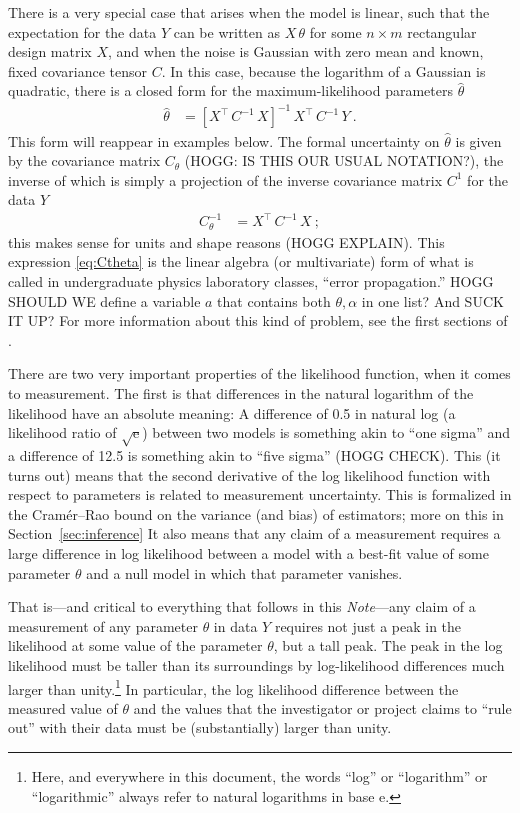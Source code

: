 \documentclass{article}
\newcommand{\documentname}{\textsl{Note}}
\newcommand{\sectionname}{Section}
\newcommand{\secref}[1]{\sectionname~\ref{#1}}
\newcommand{\e}{\mathrm{e}} %
\begin{document}
There is a very special case that arises when the model is linear,
such that the expectation for the data $Y$ can be written as $X\,\theta$ for some $n\times m$ rectangular design matrix $X$,
and when the noise is Gaussian with zero mean and known, fixed covariance tensor $C$.
In this case, because the logarithm of a Gaussian is quadratic, there is a closed form for the maximum-likelihood parameters $\hat\theta$
\begin{align}
    \hat\theta &= [X^\top\,C^{-1}\,X]^{-1}\,X^\top\,C^{-1}\,Y ~.\label{eq:wls}
\end{align}
This form will reappear in examples below.
The formal uncertainty on $\hat\theta$ is given by the covariance matrix $C_\theta$ (HOGG: IS THIS OUR USUAL NOTATION?), the inverse of which is simply a projection of the inverse covariance matrix $C^{1}$ for the data $Y$
\begin{align}
    C_\theta^{-1} &= X^\top\,C^{-1}\,X ~; \label{eq:Ctheta}
\end{align}
this makes sense for units and shape reasons (HOGG EXPLAIN).
This expression \eqref{eq:Ctheta} is the linear algebra (or multivariate) form of what is called in undergraduate physics laboratory classes, ``error propagation.''
HOGG SHOULD WE define a variable $a$ that contains both $\theta,\alpha$ in one list? And SUCK IT UP?
For more information about this kind of problem, see the first sections of \cite{fittingaline}.

There are two very important properties of the likelihood function, when it comes to measurement.
The first is that differences in the natural logarithm of the likelihood have an absolute meaning:
A difference of 0.5 in natural log (a likelihood ratio of $\sqrt{\e}$) between two models is something akin to ``one sigma'' and a difference of 12.5 is something akin to ``five sigma'' (HOGG CHECK).
This (it turns out) means that the second derivative of the log likelihood function with respect to parameters is related to measurement uncertainty.
This is formalized in the Cram\'er--Rao bound \cite{cramer, rao} on the variance (and bias) of estimators; more on this in \secref{sec:inference}
It also means that any claim of a measurement requires a large difference in log likelihood between a model with a best-fit value of some parameter $\theta$ and a null model in which that parameter vanishes.

That is---and critical to everything that follows in this \documentname---any claim of a measurement of any parameter $\theta$ in data $Y$ requires not just a peak in the likelihood at some value of the parameter $\theta$, but a tall peak.
The peak in the log likelihood must be taller than its surroundings by log-likelihood differences much larger than unity.\footnote{Here, and everywhere in this document, the words ``log'' or ``logarithm'' or ``logarithmic'' always refer to natural logarithms in base $\e$.}
In particular, the log likelihood difference between the measured value of $\theta$ and the values that the investigator or project claims to ``rule out'' with their data must be (substantially) larger than unity.
\end{document}
